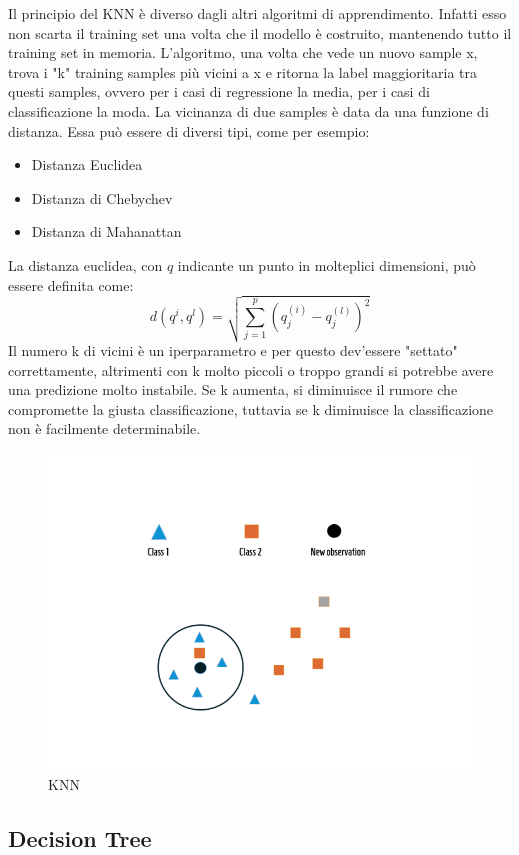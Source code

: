 Il principio del KNN è diverso dagli altri algoritmi di apprendimento. Infatti esso non scarta il training set una volta che il modello è costruito, mantenendo tutto il training set in memoria. L'algoritmo, una volta che vede un nuovo sample x, trova i "k" training samples più vicini a x e ritorna la label maggioritaria tra questi samples, ovvero per i casi di regressione la media, per i casi di classificazione la moda. La vicinanza di due samples è data da una funzione di distanza. Essa può essere di diversi tipi, come per esempio:
\begin{itemize}
    \item Distanza Euclidea
    \item Distanza di Chebychev
    \item Distanza di Mahanattan
\end{itemize}
La distanza euclidea, con \begin{math}q\end{math} indicante un punto in molteplici dimensioni, può essere definita come:
\begin{equation}
    d(q^{i},q^{l})=\sqrt{\sum_{j=1}^{p}(q_{j}^{(i)}-q_{j}^{(l)})^{2}}
\end{equation}
Il numero k di vicini è un iperparametro e per questo dev'essere "settato" correttamente, altrimenti con k molto piccoli o troppo grandi si potrebbe avere una predizione molto instabile. Se k aumenta, si diminuisce il rumore che compromette la giusta classificazione, tuttavia se k diminuisce la classificazione non è facilmente determinabile.  

\begin{figure}[H]
    \centering
    \includegraphics[width=0.65\columnwidth]{figures/k-nearest-neighbor-768x576.png}
    \caption{KNN}
    \label{fig:target}
\end{figure}

\subsection{Decision Tree}

